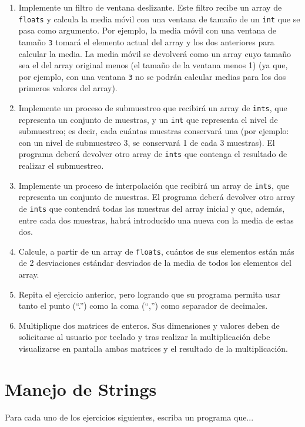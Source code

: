 \documentclass[a4paper]{article}
\newcommand{\code}[1]{\texttt{#1}}
\begin{document}
\begin{enumerate}
    \item Implemente un filtro de ventana deslizante. Este filtro recibe un array de \code{floats} y calcula la media móvil con una ventana de tamaño de un \code{int} que se pasa como argumento. Por ejemplo, la media móvil con una ventana de tamaño \code{3} tomará el elemento actual del array y los dos anteriores para calcular la media. La media móvil se devolverá como un array cuyo tamaño sea el del array original menos (el tamaño de la ventana menos 1) (ya que, por ejemplo, con una ventana \code{3} no se podrán calcular medias para los dos primeros valores del array).
    \item Implemente un proceso de submuestreo que recibirá un array de \code{ints}, que representa un conjunto de muestras, y un \code{int} que representa el nivel de submuestreo; es decir, cada cuántas muestras conservará una (por ejemplo: con un nivel de submuestreo 3, se conservará 1 de cada 3 muestras). El programa deberá devolver otro array de \code{ints} que contenga el resultado de realizar el submuestreo.
    \item Implemente un proceso de interpolación que recibirá un array de \code{ints}, que representa un conjunto de muestras. El programa deberá devolver otro array de \code{ints} que contendrá todas las muestras del array inicial y que, además, entre cada dos muestras, habrá introducido una nueva con la media de estas dos.
    \item Calcule, a partir de un array de \code{floats}, cuántos de sus elementos están más de 2 desviaciones estándar desviados de la media de todos los elementos del array.
    \item Repita el ejercicio anterior, pero logrando que su programa permita usar tanto el punto (``.'') como la coma (``,'') como separador de decimales.
    \item Multiplique dos matrices de enteros. Sus dimensiones y valores deben de solicitarse al usuario por teclado y tras realizar la multiplicación debe visualizarse en pantalla ambas matrices y el resultado de la multiplicación.
\end{enumerate}

\section{Manejo de Strings}

Para cada uno de los ejercicios siguientes, escriba un programa que...
\end{document}

